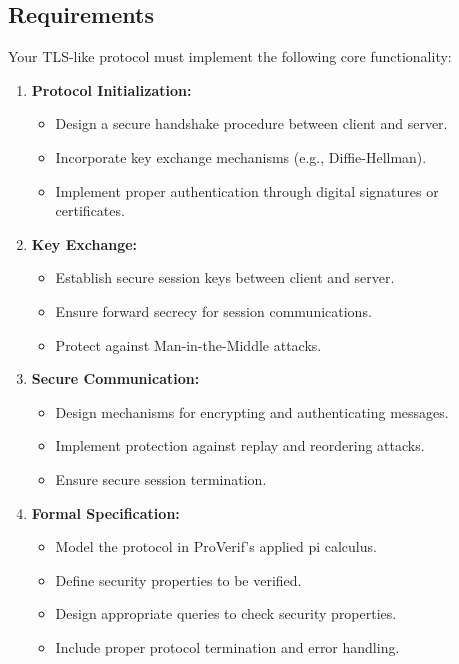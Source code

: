 \documentclass[10pt,a4paper,american]{article}
\begin{document}
\subsection*{Requirements}
Your TLS-like protocol must implement the following core functionality:

\begin{enumerate}
	\item \textbf{Protocol Initialization:}
	      \begin{itemize}
		      \item Design a secure handshake procedure between client and server.
		      \item Incorporate key exchange mechanisms (e.g., Diffie-Hellman).
		      \item Implement proper authentication through digital signatures or certificates.
	      \end{itemize}

	\item \textbf{Key Exchange:}
	      \begin{itemize}
		      \item Establish secure session keys between client and server.
		      \item Ensure forward secrecy for session communications.
		      \item Protect against Man-in-the-Middle attacks.
	      \end{itemize}

	\item \textbf{Secure Communication:}
	      \begin{itemize}
		      \item Design mechanisms for encrypting and authenticating messages.
		      \item Implement protection against replay and reordering attacks.
		      \item Ensure secure session termination.
	      \end{itemize}

	\item \textbf{Formal Specification:}
	      \begin{itemize}
		      \item Model the protocol in ProVerif's applied pi calculus.
		      \item Define security properties to be verified.
		      \item Design appropriate queries to check security properties.
		      \item Include proper protocol termination and error handling.
	      \end{itemize}
\end{enumerate}
\end{document}
